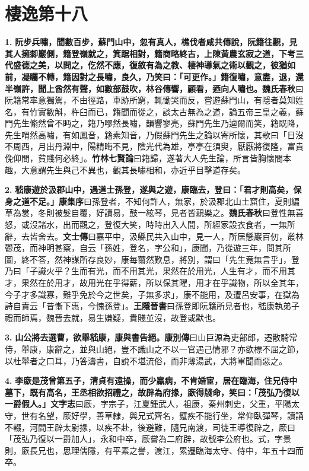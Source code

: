 \chapter{棲逸第十八}

\textbf{1.} \textbf{阮步兵嘯，聞數百步，蘇門山中，忽有真人，樵伐者咸共傳說，阮籍往觀，見其人擁厀巖側，籍登嶺就之，箕踞相對，籍商略終古，上陳黃農玄寂之道，下考三代盛德之美，以問之，仡然不應，復敘有為之教、棲神導氣之術以觀之，彼猶如前，凝矚不轉，籍因對之長嘯，良久，乃笑曰：「可更作。」籍復嘯，意盡，退，還半嶺許，聞上酋然有聲，如數部鼓吹，林谷傳響，顧看，迺向人嘯也。}{\footnotesize \textbf{魏氏春秋}曰阮籍常率意獨駕，不由徑路，車跡所窮，輒慟哭而反，嘗遊蘇門山，有隱者莫知姓名，有竹實數斛，杵臼而已，籍聞而從之，談太古無為之道，論五帝三皇之義，蘇門先生翛然曾不眄之，籍乃嘐然長嘯，韻響寥亮，蘇門先生乃逌爾而笑，籍既降，先生喟然高嘯，有如鳳音，籍素知音，乃假蘇門先生之論以寄所懷，其歌曰「日沒不周西，月出丹淵中，陽精晦不見，陰光代為雄，亭亭在須臾，厭厭將復隆，富貴俛仰間，貧賤何必終」。\textbf{竹林七賢論}曰籍歸，遂著大人先生論，所言皆胸懷間本趣，大意謂先生與己不異也，觀其長嘯相和，亦近乎目擊道存矣。}

\textbf{2.} \textbf{嵇康遊於汲郡山中，遇道士孫登，遂與之遊，康臨去，登曰：「君才則高矣，保身之道不足。」}{\footnotesize \textbf{康集序}曰孫登者，不知何許人，無家，於汲郡北山土窟住，夏則編草為裳，冬則被髮自覆，好讀易，鼓一絃琴，見者皆親樂之。\textbf{魏氏春秋}曰登性無喜怒，或沒諸水，出而觀之，登復大笑，時時出入人間，所經家設衣食者，一無所辭，去皆舍去。\textbf{文士傳}曰嘉平中，汲縣民共入山中，見一人，所居懸巖百仞，叢林鬱茂，而神明甚察，自云「孫姓，登名，字公和」，康聞，乃從遊三年，問其所圖，終不答，然神謀所存良妙，康每薾然歎息，將別，謂曰「先生竟無言乎」，登乃曰「子識火乎？生而有光，而不用其光，果然在於用光，人生有才，而不用其才，果然在於用才，故用光在乎得薪，所以保其曜，用才在乎識物，所以全其年，今子才多識寡，難乎免於今之世矣，子無多求」，康不能用，及遭呂安事，在獄為詩自責云「昔慚下惠，今愧孫登」。\textbf{王隱晉書}曰孫登即阮籍所見者也，嵇康執弟子禮而師焉，魏晉去就，易生嫌疑，貴賤並沒，故登或默也。}

\textbf{3.} \textbf{山公將去選曹，欲舉嵇康，康與書告絕。}{\footnotesize \textbf{康別傳}曰山巨源為吏部郎，遷散騎常侍，舉康，康辭之，並與山絕，豈不識山之不以一官遇己情邪？亦欲標不屈之節，以杜舉者之口耳，乃答濤書，自說不堪流俗，而非薄湯武，大將軍聞而惡之。}

\textbf{4.} \textbf{李廞是茂曾第五子，清貞有遠操，而少羸病，不肯婚宦，居在臨海，住兄侍中墓下，既有高名，王丞相欲招禮之，故辟為府掾，廞得牋命，笑曰：「茂弘乃復以一爵假人。」}{\footnotesize \textbf{文字志}曰廞，字宗子，江夏鍾武人，祖康，秦州刺史，父重，平陽太守，世有名望，廞好學，善草隸，與兄式齊名，躄疾不能行坐，常仰臥彈琴，讀誦不輟，河間王辟太尉掾，以疾不赴，後避難，隨兄南渡，司徒王導復辟之，廞曰「茂弘乃復以一爵加人」，永和中卒，廞嘗為二府辟，故號李公府也。式，字景則，廞長兄也，思理儒隱，有平素之譽，渡江，累遷臨海太守、侍中，年五十四而卒。}

